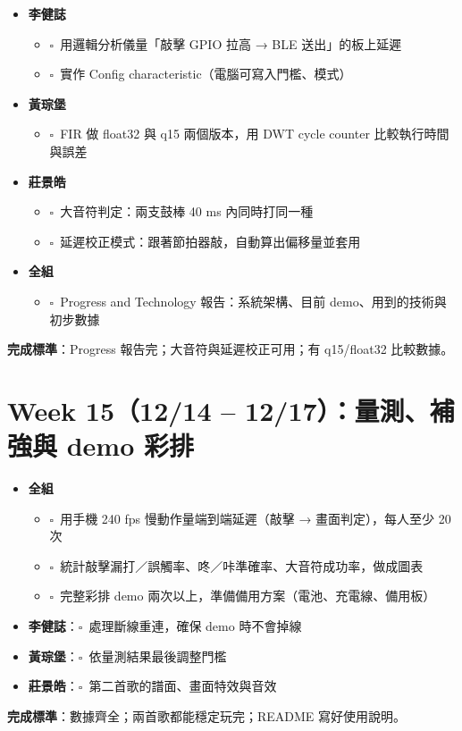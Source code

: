 \documentclass[11pt]{article}
\newcommand{\todo}{$\square$\ }
\newcommand{\who}[1]{\textbf{#1}}
\begin{document}
\begin{itemize}[label={}]
  \item \who{李健誌}
  \begin{itemize}[label={}]
    \item \todo 用邏輯分析儀量「敲擊 GPIO 拉高 → BLE 送出」的板上延遲
    \item \todo 實作 Config characteristic（電腦可寫入門檻、模式）
  \end{itemize}
  \item \who{黃琮堡}
  \begin{itemize}[label={}]
    \item \todo FIR 做 float32 與 q15 兩個版本，用 DWT cycle counter 比較執行時間與誤差
  \end{itemize}
  \item \who{莊景皓}
  \begin{itemize}[label={}]
    \item \todo 大音符判定：兩支鼓棒 40 ms 內同時打同一種
    \item \todo 延遲校正模式：跟著節拍器敲，自動算出偏移量並套用
  \end{itemize}
  \item \who{全組}
  \begin{itemize}[label={}]
    \item \todo Progress and Technology 報告：系統架構、目前 demo、用到的技術與初步數據
  \end{itemize}
\end{itemize}
\textbf{完成標準}：Progress 報告完；大音符與延遲校正可用；有 q15/float32 比較數據。

\section*{Week 15（12/14 -- 12/17）：量測、補強與 demo 彩排}

\begin{itemize}[label={}]
  \item \who{全組}
  \begin{itemize}[label={}]
    \item \todo 用手機 240 fps 慢動作量端到端延遲（敲擊 → 畫面判定），每人至少 20 次
    \item \todo 統計敲擊漏打／誤觸率、咚／咔準確率、大音符成功率，做成圖表
    \item \todo 完整彩排 demo 兩次以上，準備備用方案（電池、充電線、備用板）
  \end{itemize}
  \item \who{李健誌}：\todo 處理斷線重連，確保 demo 時不會掉線
  \item \who{黃琮堡}：\todo 依量測結果最後調整門檻
  \item \who{莊景皓}：\todo 第二首歌的譜面、畫面特效與音效
\end{itemize}
\textbf{完成標準}：數據齊全；兩首歌都能穩定玩完；README 寫好使用說明。
\end{document}
